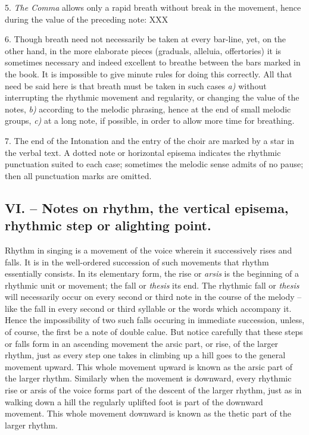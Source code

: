 5. {\it The Comma} allows only a rapid breath without break in the movement, hence during the value of the preceding note:
XXX

6. Though breath need not necessarily be taken at every bar-line, yet, on the other hand, in the more elaborate pieces (graduals, alleluia, offertories) it is sometimes necessary and indeed excellent to breathe between the bars marked in the book. It is impossible to give minute rules for doing this correctly. All that need be said here is that breath must be taken in such cases {\it a)} without interrupting the rhythmic movement and regularity, or changing the value of the notes, {\it b)} according to the melodic phrasing, hence at the end of small melodic groups, {\it c)} at a long note, if possible, in order to allow more time for breathing.

7. The end of the Intonation and the entry of the choir are marked by a star in the verbal text. A dotted note or horizontal episema indicates the rhythmic punctuation suited to each case; sometimes the melodic sense admits of no pause; then all punctuation marks are omitted.

\subsection{VI. -- Notes on rhythm, the vertical episema, rhythmic step or alighting point.}

Rhythm in singing is a movement of the voice wherein it successively rises and falls. It is in the well-ordered succession of such movements that rhythm essentially consists. In its elementary form, the rise or {\it arsis} is the beginning of a rhythmic unit or movement; the fall or {\it thesis} its end. The rhythmic fall or {\it thesis} will necessarily occur on every second or third note in the course of the melody -- like the fall in every second or third syllable or the words which accompany it. Hence the impossibility of two such falls occuring in immediate succession, unless, of course, the first be a note of double calue. But notice carefully that these steps or falls form in an ascending movement the arsic part, or rise, of the larger rhythm, just as every step one takes in climbing up a hill goes to the general movement upward. This whole movement upward is known as the arsic part of the larger rhythm. Similarly when the movement is downward, every rhythmic rise or arsis of the voice forms part of the descent of the larger rhythm, just as in walking down a hill the regularly uplifted foot is part of the downward movement. This whole movement downward is known as the thetic part of the larger rhythm.


